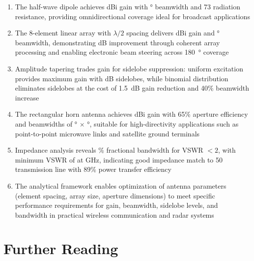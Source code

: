 \documentclass[a4paper, 11pt]{article}
\begin{document}
\begin{enumerate}
\item The half-wave dipole achieves  dBi gain with \si{\degree} beamwidth and \SI{73}{\Omega} radiation resistance, providing omnidirectional coverage ideal for broadcast applications

\item The 8-element linear array with $\lambda/2$ spacing delivers  dBi gain and \si{\degree} beamwidth, demonstrating  dB improvement through coherent array processing and enabling electronic beam steering across \SI{180}{\degree} coverage

\item Amplitude tapering trades gain for sidelobe suppression: uniform excitation provides maximum gain with  dB sidelobes, while binomial distribution eliminates sidelobes at the cost of \SI{1.5}{dB} gain reduction and 40\% beamwidth increase

\item The rectangular horn antenna achieves  dBi gain with 65\% aperture efficiency and beamwidths of \si{\degree} $\times$ \si{\degree}, suitable for high-directivity applications such as point-to-point microwave links and satellite ground terminals

\item Impedance analysis reveals \% fractional bandwidth for VSWR $< 2$, with minimum VSWR of  at  GHz, indicating good impedance match to \SI{50}{\Omega} transmission line with 89\% power transfer efficiency

\item The analytical framework enables optimization of antenna parameters (element spacing, array size, aperture dimensions) to meet specific performance requirements for gain, beamwidth, sidelobe levels, and bandwidth in practical wireless communication and radar systems
\end{enumerate}

\section*{Further Reading}
\end{document}
